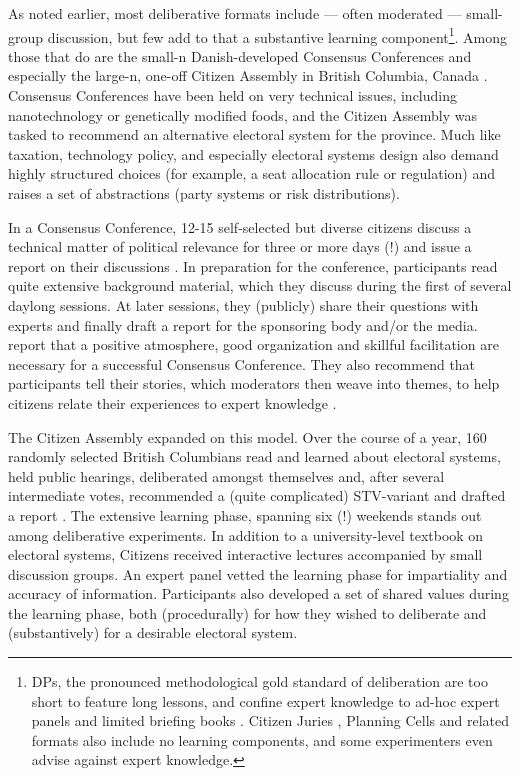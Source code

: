 As noted earlier, most deliberative formats include --- often moderated --- small-group discussion, but few add to that a substantive learning component\footnote{
	\glspl{DP}, the pronounced methodological gold standard of deliberation \citep{Mansbridge2010} are too short to feature long lessons, and confine expert knowledge to ad-hoc expert panels and limited briefing books \citep{Fishkin2009}.
	Citizen Juries \citep{SmithWales-2000-aa}, Planning Cells \citep{Dienel-1999-aa} and related formats also include no learning components, and some experimenters even advise against expert knowledge.}. %
Among those that do are the small-n Danish-developed Consensus Conferences \citep{Grundahl1995} and especially the large-n, one-off Citizen Assembly in British Columbia, Canada \citep{Citizen-2004-aa}.
Consensus Conferences have been held on very technical issues, including nanotechnology \citep{LeeKleinman2007} or genetically modified foods, and the Citizen Assembly was tasked to recommend an alternative electoral system for the province.
Much like taxation, technology policy, and especially electoral systems design also demand highly structured choices  (for example, a seat allocation rule or regulation) and raises a set of abstractions (party systems or risk distributions).

In a Consensus Conference, 12-15 self-selected but diverse citizens discuss a technical matter of political relevance for three or more days (!) and issue a report on their discussions \citep{LeeKleinman2007}.
In preparation for the conference, participants read quite extensive background material, which they discuss during the first of several daylong sessions. 
At later sessions, they (publicly) share their questions with experts and finally draft a report for the sponsoring body and/or the media.
\citeauthor{LeeKleinman2007} report that a positive atmosphere, good organization and skillful facilitation are necessary for a successful Consensus Conference.
They also recommend that participants tell their stories, which moderators then weave into themes, to help citizens relate their experiences to expert knowledge \citeyearpar[159]{LeeKleinman2007}. 

The Citizen Assembly expanded on this model. 
Over the course of a year, 160 randomly selected British Columbians read and learned about electoral systems, held public hearings, deliberated amongst themselves and, after several intermediate votes, recommended a (quite complicated) \gls{STV}-variant and drafted a report \citep{Citizen-2004-aa}.
The extensive learning phase, spanning six (!) weekends stands out among deliberative experiments.
In addition to a university-level textbook on electoral systems, Citizens received interactive lectures accompanied by small discussion groups. 
An expert panel vetted the learning phase for impartiality and accuracy of information.
Participants also developed a set of shared values during the learning phase, both (procedurally) for how they wished to deliberate and (substantively) for a desirable electoral system.

